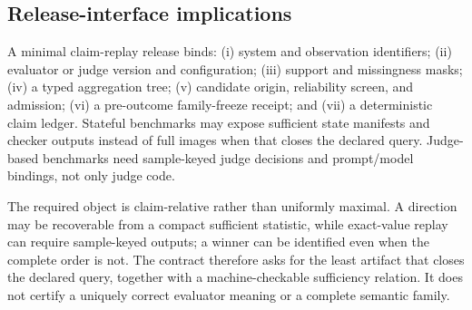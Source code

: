 \subsection{Release-interface implications}
\label{app:expanded-interface}

A minimal claim-replay release binds: (i) system and observation identifiers; (ii) evaluator or judge version and configuration; (iii) support and missingness masks; (iv) a typed aggregation tree; (v) candidate origin, reliability screen, and admission; (vi) a pre-outcome family-freeze receipt; and (vii) a deterministic claim ledger.  Stateful benchmarks may expose sufficient state manifests and checker outputs instead of full images when that closes the declared query.  Judge-based benchmarks need sample-keyed judge decisions and prompt/model bindings, not only judge code.

The required object is claim-relative rather than uniformly maximal.  A direction may be recoverable from a compact sufficient statistic, while exact-value replay can require sample-keyed outputs; a winner can be identified even when the complete order is not.  The contract therefore asks for the least artifact that closes the declared query, together with a machine-checkable sufficiency relation.  It does not certify a uniquely correct evaluator meaning or a complete semantic family.

